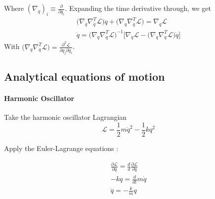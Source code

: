 \documentclass[]{article}
\begin{document}
Where $(\nabla_{\dot{q}})_i \equiv \frac{\partial}{\partial \dot{q}_i}$. Expanding the time derivative through, we get
\begin{eqnarray}
	\big( \nabla_{\dot{q}} \nabla_{\dot{q}}^T \mathcal{L} \big) \ddot{q} + \big( \nabla_q \nabla_{\dot{q}}^T \mathcal{L}\big)= \nabla_q \mathcal{L} \\
	\ddot{q} = \big( \nabla_{\dot{q}} \nabla_{\dot{q}}^T \mathcal{L} \big)^{-1} \big[ \nabla_q \mathcal{L} - \big( \nabla_q \nabla_{\dot{q}}^T \mathcal{L}\big) \dot{q}\big]
\end{eqnarray}
With $\big( \nabla_q \nabla_{\dot{q}}^T \mathcal{L}\big) = \frac{\partial^2 \mathcal{L}}{\partial q_j \partial \dot{q}_i}$. 

\subsection{Analytical equations of motion}

\paragraph{Harmonic Oscillator}

Take the harmonic oscillator Lagrangian 
\begin{equation}
	\mathcal{L} = \frac{1}{2}m \dot{q}^2 - \frac{1}{2}k q^2
\end{equation}

Apply the Euler-Lagrange equations \cite{Taylor}:

\begin{eqnarray}
	\frac{\partial \mathcal{L}}{\partial q} = \frac{d}{d} \frac{\partial \mathcal{L}}{\partial \dot{q}} \\
	-kq = \frac{d}{dt} m\dot{q} \\
	\ddot{q} = -\frac{k}{m} q
\end{eqnarray}

\printbibliography
\end{document}
